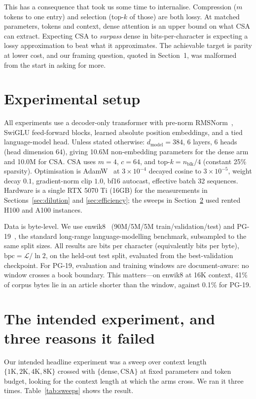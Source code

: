 \documentclass[11pt]{article}
\begin{document}
This has a consequence that took us some time to internalise. Compression
($m$ tokens to one entry) and selection (top-$k$ of those) are both lossy.
At matched parameters, tokens and context, dense attention is an upper bound on
what CSA can extract. Expecting CSA to \emph{surpass} dense in bits-per-character
is expecting a lossy approximation to beat what it approximates. The achievable
target is parity at lower cost, and our framing question, quoted in
Section~1, was malformed from the start in asking for more.

\section{Experimental setup}

All experiments use a decoder-only transformer with pre-norm
RMSNorm~\cite{zhang2019rmsnorm}, SwiGLU feed-forward blocks, learned absolute
position embeddings, and a tied language-model head. Unless stated otherwise:
$d_{\text{model}}=384$, 6 layers, 6 heads (head dimension 64), giving 10.6M
non-embedding parameters for the dense arm and 10.0M for CSA. CSA uses $m=4$,
$c=64$, and $\text{top-}k = n_{\text{blk}}/4$ (constant 25\% sparsity).
Optimisation is AdamW~\cite{loshchilov2019adamw} at $3\times10^{-4}$ decayed
cosine to $3\times10^{-5}$, weight decay $0.1$, gradient-norm clip $1.0$, bf16
autocast, effective batch 32 sequences. Hardware is a single RTX 5070 Ti
(16GB) for the measurements in Sections~\ref{sec:dilution} and
\ref{sec:efficiency}; the sweeps in Section~\ref{sec:sweep} used rented H100
and A100 instances.

Data is byte-level. We use enwik8~\cite{hutter2006} (90M/5M/5M
train/validation/test) and PG-19~\cite{rae2019pg19}, the standard long-range
language-modelling benchmark, subsampled to the same split sizes. All results
are bits per character (equivalently bits per byte),
$\mathrm{bpc} = \mathcal{L}/\ln 2$, on the held-out test split, evaluated from
the best-validation checkpoint. For PG-19, evaluation and training windows are
document-aware: no window crosses a book boundary. This matters---on enwik8 at
16K context, 41\% of corpus bytes lie in an article shorter than the window,
against 0.1\% for PG-19.

\section{The intended experiment, and three reasons it failed}
\label{sec:sweep}

Our intended headline experiment was a sweep over context length
$\{1\text{K}, 2\text{K}, 4\text{K}, 8\text{K}\}$ crossed with
$\{\text{dense}, \text{CSA}\}$ at fixed parameters and token budget, looking
for the context length at which the arms cross. We ran it three times.
Table~\ref{tab:sweeps} shows the result.
\end{document}
